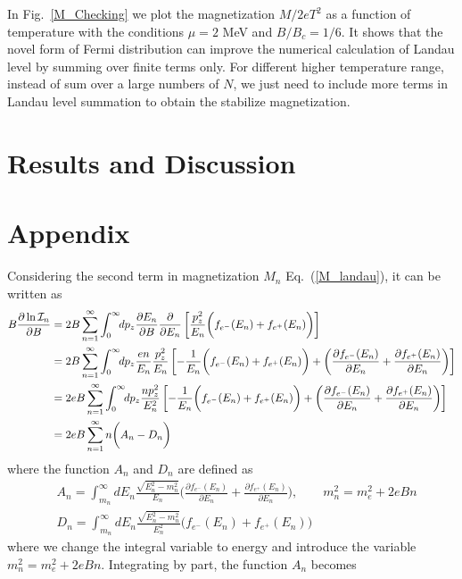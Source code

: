 \documentclass[sn-mathphys,Numbered]{sn-jnl}
\begin{document}
In Fig.~\ref{M_Checking} we plot the magnetization $M/2eT^2$ as a function of temperature with the conditions $\mu=2$ MeV and $B/B_c=1/6$. It shows that the novel form of Fermi distribution can improve the numerical calculation of Landau level by summing over finite terms only. For different higher temperature range, instead of sum over a large numbers of $N$, we just need to include more terms in Landau level summation to obtain the stabilize magnetization.


\section{Results and Discussion}
\label{sec12}


\section{Appendix}
Considering the second term in magnetization $M_n$ Eq.~(\ref{M_landau}), it can be written as
\begin{align}
B\frac{\partial\ln\mathcal{I}_n}{\partial B}&=2B \sum_{n=1}^\infty\int_0^\infty\!\!dp_z \frac{\partial E_n}{\partial B}\frac{\partial}{\partial E_n}\left[\frac{p_z^2}{E_{n}}\bigg(f_{e^-}(E_n)+f_{e^+}(E_n)\bigg)\right]\notag\\
&=2B \sum_{n=1}^\infty\int_0^\infty\!\!dp_z \frac{en}{E_n}\frac{p_z^2}{E_{n}}\left[-\frac{1}{E_{n}}\bigg(f_{e^-}(E_n)+f_{e^+}(E_n)\bigg)+\bigg(\frac{\partial f_{e^-}(E_n)}{\partial E_n}+\frac{\partial f_{e^+}(E_n)}{\partial E_n}\bigg)\right]\notag\\
&=2eB \sum_{n=1}^\infty\int_0^\infty\!\!dp_z \frac{n p_z^2}{E^2_{n}}\left[-\frac{1}{E_{n}}\bigg(f_{e^-}(E_n)+f_{e^+}(E_n)\bigg)+\bigg(\frac{\partial f_{e^-}(E_n)}{\partial E_n}+\frac{\partial f_{e^+}(E_n)}{\partial E_n}\bigg)\right]\notag\\
&=2eB\sum_{n=1}^\infty n\bigg(A_n-D_n\bigg)
\end{align}
where the function $A_n$ and $D_n$ are defined as
\begin{align}
\label{Function_A}
&A_n=\int_{m_n}^\infty\!\!dE_n \frac{\sqrt{E^2_n-m^2_n}}{E_{n}}\bigg(\frac{\partial f_{e^-}(E_n)}{\partial E_n}+\frac{\partial f_{e^+}(E_n)}{\partial E_n}\bigg),\qquad m_n^2=m^2_e+2eBn\\ 
\label{Function_D}
&D_n=\int_{m_n}^\infty\!\!dE_n \frac{\sqrt{E^2_n-m^2_n}}{E^2_{n}}\bigg(f_{e^-}(E_n)+f_{e^+}(E_n)\bigg)
\end{align}
where we change the integral variable to energy and introduce the variable $m_n^2=m^2_e+2eBn$. Integrating by part, the function $A_n$ becomes
\end{document}
